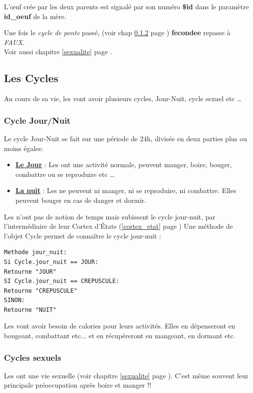 \documentclass[french]{report}
\begin{document}
L’œuf crée par les deux parents est signalé par son numéro \textbf{\$id} dans le paramètre \textbf{id\_oeuf} de la mère.

Une fois le \textit{cycle de ponte} passé, (voir chap \ref{cycle_sexuel} page \pageref{cycle_sexuel} ) \textbf{fecondee} repasse à \textit{FAUX}.\\

Voir aussi chapitre \ref{sexualite} page \pageref{sexualite}.\\



\subsection{Les Cycles}\label{cycles}
Au cours de sa vie, les \CoCiX vont avoir plusieurs cycles, Jour-Nuit, cycle sexuel etc \dots
\subsubsection{Cycle Jour/Nuit}
Le cycle Jour-Nuit se fait sur une période de 24h, divisée en deux parties plus ou moins égales:

\begin{itemize}
	\item \underline{\textbf{Le Jour}} : Les \CoCiX ont une activité normale, peuvent manger, boire, bouger, combattre ou se reproduire etc \dots
	
	\item \underline{\textbf{La nuit}} : Les \CoCiX ne peuvent ni manger, ni se reproduire, ni combattre. Elles peuvent bouger en cas de danger et  dormir.
\end{itemize}

Les \CoCiX n'ont pas de notion de temps mais subissent le cycle jour-nuit, par l'intermédiaire de leur Cortex d'États (\ref{cortex_etat} page \pageref{cortex_etat}) Une méthode de l'objet Cycle permet de connaître le cycle jour-nuit :\\
\begin{lstlisting}
Methode jour_nuit:
Si Cycle.jour_nuit == JOUR:
Retourne "JOUR"
SI Cycle.jour_nuit == CREPUSCULE:
Retourne "CREPUSCULE"
SINON:
Retourne "NUIT"
\end{lstlisting}	

Les \CoCiX vont avoir besoin de calories pour leurs activités. Elles en dépenseront en bougeant, combattant etc... et en récupéreront en mangeant, en dormant etc.

\subsubsection{Cycles sexuels}\label{cycle_sexuel}
Les \CoCiX ont une vie sexuelle (voir chapitre \ref{sexualite} page \pageref{sexualite}). C'est même souvent leur principale préoccupation après boire et manger !!
\end{document}
